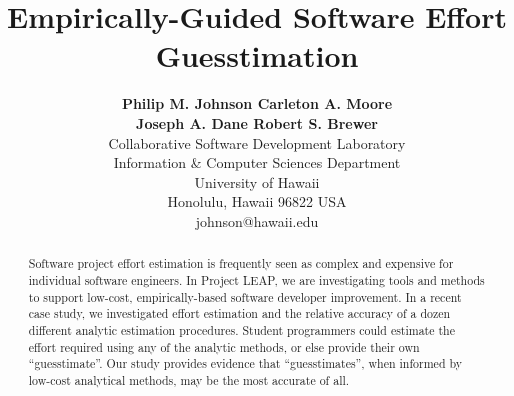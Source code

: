 




\title{Empirically-Guided Software Effort Guesstimation}

\author{
        {\bf Philip M. Johnson \hfill Carleton A. Moore}\\ 
        {\bf Joseph A. Dane \hfill  Robert S. Brewer }\\ 
        Collaborative Software Development Laboratory\\
        Information \& Computer Sciences Department\\
        University of Hawaii\\
        Honolulu, Hawaii 96822 USA \\
        johnson@hawaii.edu
        }
\maketitle
%
%
{}

\begin{abstract}
  Software project effort estimation is frequently seen as complex and
  expensive for individual software engineers.  In Project LEAP, we are
  investigating tools and methods to support low-cost, empirically-based software
  developer improvement. In a recent case study, we investigated effort
  estimation and the relative accuracy of a dozen different analytic estimation
  procedures. Student programmers could estimate the effort required using
  any of the analytic methods, or else provide their own ``guesstimate''.
  Our study provides evidence that ``guesstimates'', when informed by
  low-cost analytical methods, may be the most accurate of all. 
\end{abstract}

